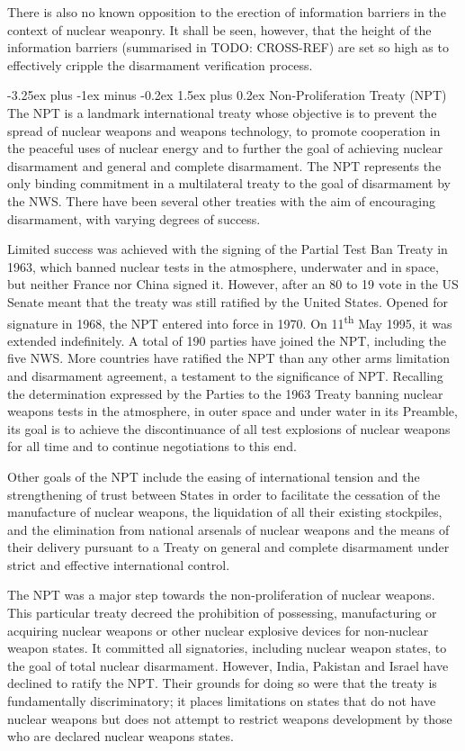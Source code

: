 \documentclass[twoside,titlepage,11pt,twocolumn,a4paper]{article}
\makeatletter
\renewcommand{\paragraph}{\@startsection{paragraph}{4}{0ex}%
   {-3.25ex plus -1ex minus -0.2ex}%
   {1.5ex plus 0.2ex}%
   {\normalfont\normalsize\bfseries}}
\makeatother
\begin{document}
There is also no known opposition to the erection of information
barriers in the context of nuclear weaponry. It shall be seen,
however, that the height of the information barriers (summarised in
TODO: CROSS-REF) are set so high as to effectively cripple the
disarmament verification process.

\paragraph{Non-Proliferation Treaty (NPT)}
The NPT is a landmark international treaty whose objective is to
prevent the spread of nuclear weapons and weapons technology, to
promote cooperation in the peaceful uses of nuclear energy and to
further the goal of achieving nuclear disarmament and general and
complete disarmament. The NPT represents the only binding commitment
in a multilateral treaty to the goal of disarmament by the NWS. There
have been several other treaties with the aim of encouraging
disarmament, with varying degrees of success.

Limited success was achieved with the signing of the Partial Test Ban
Treaty in 1963, which banned nuclear tests in the atmosphere,
underwater and in space, but neither France nor China signed
it. However, after an 80 to 19 vote in the US Senate meant that the
treaty was still ratified by the United States. Opened for signature
in 1968, the NPT entered into force in 1970. On 11\textsuperscript{th}
May 1995, it was extended indefinitely. A total of 190 parties have
joined the NPT, including the five NWS. More countries have ratified
the NPT than any other arms limitation and disarmament agreement, a
testament to the significance of NPT. Recalling the determination
expressed by the Parties to the 1963 Treaty banning nuclear weapons
tests in the atmosphere, in outer space and under water in its
Preamble, its goal is to achieve the discontinuance of all test
explosions of nuclear weapons for all time and to continue
negotiations to this end.

Other goals of the NPT include the easing of international tension and
the strengthening of trust between States in order to facilitate the
cessation of the manufacture of nuclear weapons, the liquidation of
all their existing stockpiles, and the elimination from national
arsenals of nuclear weapons and the means of their delivery pursuant
to a Treaty on general and complete disarmament under strict and
effective international control. \citep{statement2005}

The NPT was a major step towards the non-proliferation of nuclear
weapons. This particular treaty decreed the prohibition of possessing,
manufacturing or acquiring nuclear weapons or other nuclear explosive
devices for non-nuclear weapon states. It committed all signatories,
including nuclear weapon states, to the goal of total nuclear
disarmament. However, India, Pakistan and Israel have declined to
ratify the NPT. Their grounds for doing so were that the treaty is
fundamentally discriminatory; it places limitations on states that do
not have nuclear weapons but does not attempt to restrict weapons
development by those who are declared nuclear weapons states.
\end{document}
